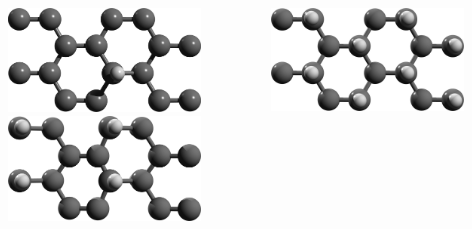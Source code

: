 \documentclass{beamer}
\begin{document}
\begin{frame}

\begin{columns}


\begin{center}
\includegraphics[width=0.8\textwidth]{figs/row.png}\\

\vspace{7mm}
\includegraphics[width=0.8\textwidth]{figs/alt1.png}\\


\vspace{5mm}
\end{center}


\centering
\begin{center}
\includegraphics[width=0.8\textwidth]{figs/up1.png}\\


\end{center}
\end{columns}
\end{frame}
\end{document}
